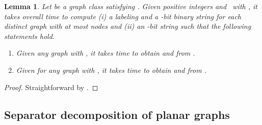 \documentclass[12pt]{article}
\newtheorem{lemma}{Lemma}[section]
\begin{document}
\begin{lemma}
\label{lemma:basis}
Let  be a graph class satisfying .
Given positive integers  and~ with , it takes overall  time to compute (i) a labeling
 and a -bit binary string 
for each distinct graph  with at most  nodes and (ii) an
-bit string  such that the following
statements hold.
\begin{enumerate}
\addtolength{\itemsep}{-0.5\baselineskip}
\item 
\label{basis:1}
Given any graph  with , it takes 
time to obtain  and  from
.

\item  
\label{basis:2}
Given  for any graph  with , it takes  time to obtain  and 
from .
\end{enumerate}
\end{lemma}

\begin{proof}
Straightforward by .
\end{proof}



\subsection{Separator decomposition of planar graphs}
\end{document}
